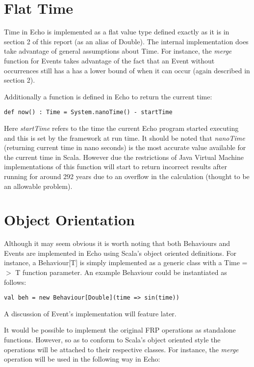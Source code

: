   \section{Flat Time}
    Time in Echo is implemented as a flat value type defined exactly as it is in 
    section 2 of this report (as an alias of Double). The internal implementation does take advantage
    of general assumptions about Time. For instance, the \emph{merge} function for Events takes advantage
    of the fact that an Event without occurrences still has a has a lower bound of when it can occur (again described
    in section 2). 
    
    Additionally a function is defined in Echo to return the current time:
    
\begin{verbatim}
def now() : Time = System.nanoTime() - startTime
\end{verbatim}      

    Here \emph{startTime} refers to the time the current Echo program started executing and this is
    set by the framework at run time. It should be noted that \emph{nanoTime} (returning current time in
    nano seconds) is the most accurate value available for the current time in Scala. However due the restrictions
    of Java Virtual Machine implementations of this function will start to return incorrect results 
    after running for around 292 years due to an overflow in the calculation (thought to be an allowable
    problem).
    
  \section{Object Orientation}
    Although it may seem obvious it is worth noting that both Behaviours and Events are implemented in
    Echo using Scala's object oriented definitions. For instance, a Behaviour[T] is simply
    implemented as a generic class with a Time =$>$ T function parameter. An example Behaviour
    could be instantiated as follows:

\begin{verbatim}
val beh = new Behaviour[Double](time => sin(time))
\end{verbatim}  

    A discussion of Event's implementation will feature later.
    
    It would be possible to implement the original FRP operations as standalone functions. However, so
    as to conform to Scala's object oriented style the operations will be attached to their respective
    classes. For instance, the \emph{merge} operation will be used in the following way in Echo:
    
